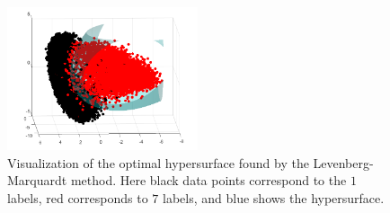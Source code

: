 \documentclass[12pt]{article}%
\begin{document}
\begin{figure}[H]
    \centering
    \includegraphics[width=0.5\textwidth,height=\textwidth,keepaspectratio]{images/LM-hypersurface.png}
    \caption{Visualization of the optimal hypersurface found by the Levenberg-Marquardt method. Here black data points correspond to the $1$ labels, red corresponds to $7$ labels, and blue shows the hypersurface.}
    \label{fig}
\end{figure}
\end{document}
